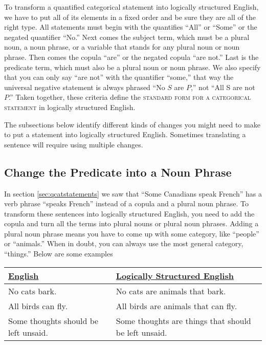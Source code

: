 To transform a quantified categorical statement into logically structured English, we have to put all of its elements in a fixed order and be sure they are all of the right type. All statements must begin with the quantifies ``All'' or ``Some'' or the negated quantifier ``No.'' Next comes the subject term, which must be a plural noun, a noun phrase, or a variable that stands for any plural noun or noun phrase. Then comes the copula ``are'' or the negated copula ``are not.'' Last is the predicate term, which must also be a plural noun or noun phrase. We also specify that you can only say ``are not'' with the quantifier ``some,'' that way the universal negative statement is always phrased ``No $S$ are $P$,'' not ``All S are not $P$.'' Taken together, these criteria define the \textsc{\gls{standard form for a categorical statement}} in logically structured English. \label{def:standard_form_cat_statement}

The subsections below identify different kinds of changes you might need to make to put a statement into logically structured English. Sometimes translating a sentence will require using multiple changes.

\subsection{Change the Predicate into a Noun Phrase}
\label{subsec:predicate_noun_phrase}
In section \ref{sec:qcatstatements} we saw that ``Some Canadians speak French'' has a verb phrase ``speaks French'' instead of a copula and a plural noun phrase. To transform these sentences into logically structured English, you need to add the copula and turn all the terms into plural nouns or plural noun phrases. Adding a plural noun phrase means you have to come up with some category, like ``people'' or ``animals.'' When in doubt, you can always use the most general category, ``things.'' Below are some examples

\begin{table}
\begin{longtabu}{p{.5\linewidth}p{.5\linewidth}}
\underline{English} &
\underline{Logically Structured English} \\
\endhead
No cats bark. &
No cats are animals that bark.  \\

All birds can fly. &
All birds are animals that can fly.  \\

Some thoughts should be left unsaid. &
Some thoughts are things that should be left unsaid.
\end{longtabu}
\end{table}

